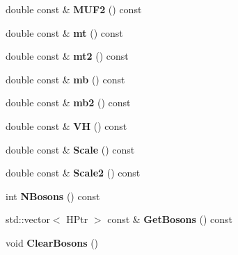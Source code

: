 \begin{DoxyCompactItemize}
\item 
\hypertarget{classHiggsModel_af636a81480654395084ead903d5ee00b}{}double const \& {\bfseries M\+U\+F2} () const \label{classHiggsModel_af636a81480654395084ead903d5ee00b}

\item 
\hypertarget{classHiggsModel_a913923ce15ea38a8a1576ea9e5d23d10}{}double const \& {\bfseries mt} () const \label{classHiggsModel_a913923ce15ea38a8a1576ea9e5d23d10}

\item 
\hypertarget{classHiggsModel_ad0685a0848a95342b272147317948d10}{}double const \& {\bfseries mt2} () const \label{classHiggsModel_ad0685a0848a95342b272147317948d10}

\item 
\hypertarget{classHiggsModel_a8ec3f6255ab720fb08a94937d436cdea}{}double const \& {\bfseries mb} () const \label{classHiggsModel_a8ec3f6255ab720fb08a94937d436cdea}

\item 
\hypertarget{classHiggsModel_a33ea2c639935f9971bdca5e5994325ff}{}double const \& {\bfseries mb2} () const \label{classHiggsModel_a33ea2c639935f9971bdca5e5994325ff}

\item 
\hypertarget{classHiggsModel_a9711ab1e2b584f86d75f6e53b9a35822}{}double const \& {\bfseries V\+H} () const \label{classHiggsModel_a9711ab1e2b584f86d75f6e53b9a35822}

\item 
\hypertarget{classHiggsModel_af679483d403b1d8b2f291542215fa0bd}{}double const \& {\bfseries Scale} () const \label{classHiggsModel_af679483d403b1d8b2f291542215fa0bd}

\item 
\hypertarget{classHiggsModel_a2572b90895176763db5cbbb3233ec242}{}double const \& {\bfseries Scale2} () const \label{classHiggsModel_a2572b90895176763db5cbbb3233ec242}

\item 
\hypertarget{classHiggsModel_a08c33da1ef0b46ed04dd5f1f9f84ae9a}{}int {\bfseries N\+Bosons} () const \label{classHiggsModel_a08c33da1ef0b46ed04dd5f1f9f84ae9a}

\item 
\hypertarget{classHiggsModel_a56909ae8843fbd15bc54df272e1a245d}{}std\+::vector$<$ H\+Ptr $>$ const \& {\bfseries Get\+Bosons} () const \label{classHiggsModel_a56909ae8843fbd15bc54df272e1a245d}

\item 
\hypertarget{classHiggsModel_a4b3180e3b5172e9a3fcde3f2740d2eb0}{}void {\bfseries Clear\+Bosons} ()\label{classHiggsModel_a4b3180e3b5172e9a3fcde3f2740d2eb0}


\end{DoxyCompactItemize}
